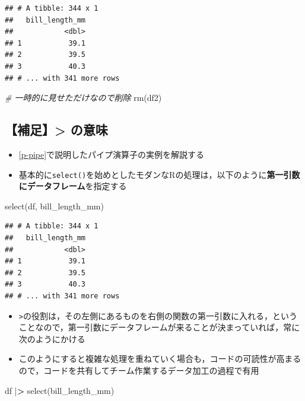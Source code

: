 \documentclass[
  xelatex,ja=standard, b5paper]{bxjsbook}
\newenvironment{Shaded}{\begin{snugshade}}{\end{snugshade}}
\newcommand{\CommentTok}[1]{\textcolor[rgb]{0.56,0.35,0.01}{\textit{#1}}}
\newcommand{\ErrorTok}[1]{\textcolor[rgb]{0.64,0.00,0.00}{\textbf{#1}}}
\newcommand{\FunctionTok}[1]{\textcolor[rgb]{0.00,0.00,0.00}{#1}}
\newcommand{\NormalTok}[1]{#1}
\newcommand{\SpecialCharTok}[1]{\textcolor[rgb]{0.00,0.00,0.00}{#1}}
\providecommand{\tightlist}{%
  \setlength{\itemsep}{0pt}\setlength{\parskip}{0pt}}
\begin{document}
\begin{verbatim}
## # A tibble: 344 x 1
##   bill_length_mm
##            <dbl>
## 1           39.1
## 2           39.5
## 3           40.3
## # ... with 341 more rows
\end{verbatim}

\begin{Shaded}
\begin{Highlighting}[]
\CommentTok{\# 一時的に見せただけなので削除}
\FunctionTok{rm}\NormalTok{(df2)}
\end{Highlighting}
\end{Shaded}

\hypertarget{select-standard-pipe}{%
\subsection{【補足】\textbar\textgreater{} の意味}\label{select-standard-pipe}}

\begin{itemize}
\tightlist
\item
  \ref{p-pipe}で説明したパイプ演算子の実例を解説する
\item
  基本的に\texttt{select()}を始めとしたモダンなRの処理は，以下のように\textbf{第一引数にデータフレーム}を指定する
\end{itemize}

\begin{Shaded}
\begin{Highlighting}[]
\FunctionTok{select}\NormalTok{(df, bill\_length\_mm)}
\end{Highlighting}
\end{Shaded}

\begin{verbatim}
## # A tibble: 344 x 1
##   bill_length_mm
##            <dbl>
## 1           39.1
## 2           39.5
## 3           40.3
## # ... with 341 more rows
\end{verbatim}

\begin{itemize}
\tightlist
\item
  \texttt{\textbar{}\textgreater{}}の役割は，その左側にあるものを右側の関数の第一引数に入れる，ということなので，第一引数にデータフレームが来ることが決まっていれば，常に次のようにかける
\item
  このようにすると複雑な処理を重ねていく場合も，コードの可読性が高まるので，コードを共有してチーム作業するデータ加工の過程で有用
\end{itemize}

\begin{Shaded}
\begin{Highlighting}[]
\NormalTok{df }\SpecialCharTok{|}\ErrorTok{\textgreater{}} 
  \FunctionTok{select}\NormalTok{(bill\_length\_mm)}
\end{Highlighting}
\end{Shaded}
\end{document}
